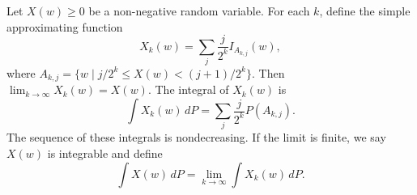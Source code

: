 Let $X(w) \geq 0$ be a non-negative random variable. For each $k$, define the simple approximating function
$$X_k(w) = \sum_{j} \frac{j}{2^k} I_{A_{k,j}}(w),$$
where $A_{k,j} = \{ w \mid j/2^k \leq X(w) < (j+1)/2^k \}$. Then $\lim_{k \to \infty} X_k(w) = X(w)$. The integral of $X_k(w)$ is
$$\int X_k(w) \, dP = \sum_{j} \frac{j}{2^k} P(A_{k,j}).$$
The sequence of these integrals is nondecreasing. If the limit is finite, we say $X(w)$ is integrable and define
$$\int X(w) \, dP = \lim_{k \to \infty} \int X_k(w) \, dP.$$
